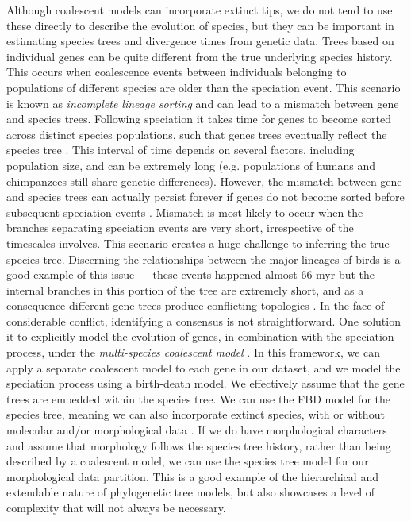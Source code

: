 \documentclass[11pt]{article}
\begin{document}
Although coalescent models can incorporate extinct tips, we do not tend to use these directly to describe the evolution of species, but they can be important in estimating species trees and divergence times from genetic data. %
Trees based on individual genes can be quite different from the true underlying species history. 
This occurs when coalescence events between individuals belonging to populations of different species are older than the speciation event.
This scenario is known as \textit{incomplete lineage sorting} and can lead to a mismatch between gene and species trees.
Following speciation it takes time for genes to become sorted across distinct species populations, such that genes trees  eventually reflect the species tree \cite{Maddison2006}.
This interval of time depends on several factors, including population size, and can be extremely long (e.g. populations of humans and chimpanzees still share genetic differences). 
However, the mismatch between gene and species trees can actually persist forever if genes do not become sorted before subsequent speciation events \cite{Xu2016}. 
Mismatch is most likely to occur when the branches separating speciation events are very short, irrespective of the timescales involves. This scenario creates a huge challenge to inferring the true species tree.
Discerning the relationships between the major lineages of birds is a good example of this issue --- these events happened almost 66 myr but the internal branches in this portion of the tree are extremely short, and as a consequence different gene trees produce conflicting topologies \cite{Jarvis2014}.
In the face of considerable conflict, identifying a consensus is not straightforward. 
One solution it to explicitly model the evolution of genes, in combination with the speciation process, under the \textit{multi-species coalescent model} \cite{Heled2010}.
In this framework, we can apply a separate coalescent model to each gene in our dataset, and we model the speciation process using a birth-death model. 
We effectively assume that the gene trees are embedded within the species tree.
We can use the FBD model for the species tree, meaning we can also incorporate extinct species, with or without molecular and/or morphological data \cite{ogilvie2018}.
If we do have morphological characters and assume that morphology follows the species tree history, rather than being described by a coalescent model, we can use the species tree model for our morphological data partition.
This is a good example of the hierarchical and extendable nature of phylogenetic tree models, but also showcases a level of complexity that will not always be necessary.
\end{document}
